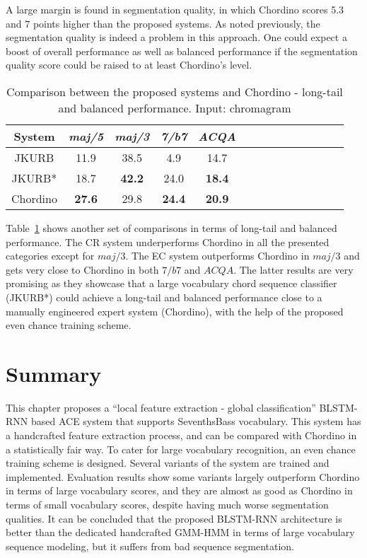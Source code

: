 A large margin is found in segmentation quality, in which Chordino scores 5.3 and 7 points higher than the proposed systems. As noted previously, the segmentation quality is indeed a problem in this approach. One could expect a boost of overall performance as well as balanced performance if the segmentation quality score could be raised to at least Chordino's level.

\begin{table}[htb]
	\caption{Comparison between the proposed systems and Chordino - long-tail and balanced performance. Input: chromagram}
	\label{tab:4-cpcd-2}
	\centering
	\scriptsize
	\begin{tabular}{|c|c|c|c|c|c|c|c|c|c|c|c|c|c|}\hline
		System & \textit{maj/5} & \textit{maj/3} & \textit{7/b7} & \textit{ACQA} \\ \hline
		JKURB & 11.9 & 38.5 & 4.9 & 14.7\\ \hline
		JKURB* & 18.7 & \textbf{42.2} & 24.0 & \textbf{18.4}\\ \hline
		Chordino & \textbf{ 27.6} & 29.8 & \textbf{24.4} & \textbf{20.9}\\ \hline
	\end{tabular}
\end{table}
Table~\ref{tab:4-cpcd-2} shows another set of comparisons in terms of long-tail and balanced performance. The CR system underperforms Chordino in all the presented categories except for $maj/3$.	The EC system outperforms Chordino in $maj/3$ and gets very close to Chordino in both $7/b7$ and $ACQA$. The latter results are very promising as they showcase that a large vocabulary chord sequence classifier (JKURB*) could achieve a long-tail and balanced performance close to a manually engineered expert system (Chordino), with the help of the proposed even chance training scheme.

\section{Summary}\label{sec:4-concln}
This chapter proposes a ``local feature extraction - global classification'' BLSTM-RNN based ACE system that supports SeventhsBass vocabulary. This system has a handcrafted feature extraction process, and can be compared with Chordino in a statistically fair way. To cater for large vocabulary recognition, an even chance training scheme is designed. Several variants of the system are trained and implemented. Evaluation results show some variants largely outperform Chordino in terms of large vocabulary scores, and they are almost as good as Chordino in terms of small vocabulary scores, despite having much worse segmentation qualities. It can be concluded that the proposed BLSTM-RNN architecture is better than the dedicated handcrafted GMM-HMM in terms of large vocabulary sequence modeling, but it suffers from bad sequence segmentation.


